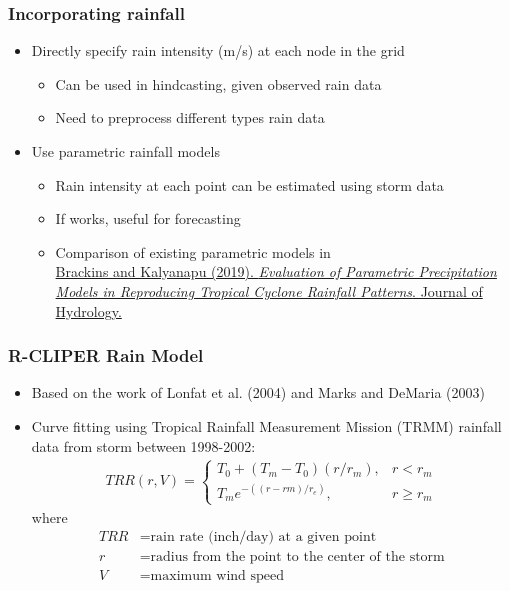 \documentclass[10pt]{oden_beamer}
\begin{document}
\begin{frame}
  \frametitle{Incorporating rainfall}
  \begin{itemize}
  \item Directly specify rain intensity (m/s) at each node in the grid
    \begin{itemize}
    \item Can be used in hindcasting, given observed rain data
    \item Need to preprocess different types rain data
    \end{itemize}
  \item Use parametric rainfall models
    \begin{itemize}
    \item Rain intensity at each point can be estimated using storm data
    \item If works, useful for forecasting
    \item Comparison of existing parametric models in \\
      \vspace{0.1cm}
      \ul{Brackins and Kalyanapu (2019). \emph{Evaluation of Parametric Precipitation Models in Reproducing Tropical Cyclone Rainfall Patterns}. Journal of Hydrology.}
    \end{itemize}
  \end{itemize}
\end{frame}
\begin{frame}
  \frametitle{R-CLIPER Rain Model}
  \begin{itemize}
  \item Based on the work of Lonfat et al. (2004) and Marks and DeMaria (2003)
  \item Curve fitting using Tropical Rainfall Measurement Mission (TRMM)  rainfall data from storm between 1998-2002:
    \begin{align}
      TRR(r, V) =
    \begin{cases}
      T_0 + (T_m - T_0)(r/r_m), & r < r_m \\
      T_m e^{-((r-rm)/r_e)}, & r \geq r_m
    \end{cases}
    \end{align}
    where
    \begin{align*}
      TRR &= \text{rain rate (inch/day) at a given point} \\
      r &= \text{radius from the point to the center of the storm} \\
      V &= \text{maximum wind speed}
    \end{align*}
  \end{itemize}
\end{frame}
\end{document}
